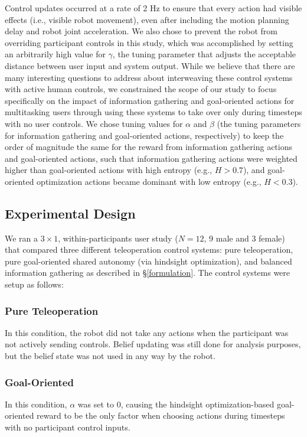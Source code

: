 \documentclass[conference]{IEEEtran}
\begin{document}
Control updates occurred at a rate of 2 Hz to ensure that every action had visible effects (i.e., visible robot movement), even after including the motion planning delay and robot joint acceleration. We also chose to prevent the robot from overriding participant controls in this study, which was accomplished by setting an arbitrarily high value for $\gamma$, the tuning parameter that adjusts the acceptable distance between user input and system output. While we believe that there are many interesting questions to address about interweaving these control systems with active human controls, we constrained the scope of our study to focus specifically on the impact of information gathering and goal-oriented actions for multitasking users through using these systems to take over only during timesteps with no user controls. We chose tuning values for $\alpha$ and $\beta$ (the tuning parameters for information gathering and goal-oriented actions, respectively) to keep the order of magnitude the same for the reward from information gathering actions and goal-oriented actions, such that information gathering actions were weighted higher than goal-oriented actions with high entropy (e.g., $H > 0.7$), and goal-oriented optimization actions became dominant with low entropy (e.g., $H < 0.3$).

\subsection{Experimental Design}

We ran a $3 \times 1$, within-participants user study ($N = 12$, 9 male and 3 female) that compared three different teleoperation control systems: pure teleoperation,  pure goal-oriented shared autonomy (via hindsight optimization), and balanced information gathering as described in \S\ref{formulation}. The control systems were setup as follows:

\subsubsection{Pure Teleoperation}
In this condition, the robot did not take any actions when the participant was not actively sending controls. Belief updating was still done for analysis purposes, but the belief state was not used in any way by the robot.
\subsubsection{Goal-Oriented}
In this condition, $\alpha$ was set to 0, causing the hindsight optimization-based goal-oriented reward to be the only factor when choosing actions during timesteps with no participant control inputs.
\end{document}
